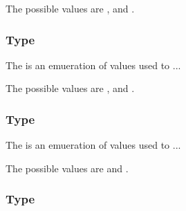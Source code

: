 The possible values are ,  and
.

\subsubsection{Type \fixttspace{}}



The  is an emueration of values used to ...

The possible values are ,  and
.

\subsubsection{Type \fixttspace{}}



The  is an emueration of values used to ...

The possible values are  and .

\subsubsection{Type \fixttspace{}}



